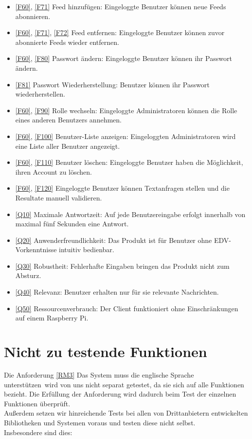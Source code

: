 \begin{itemize}
\item \ref{F60}, \ref{F71} Feed hinzufügen: Eingeloggte Benutzer können neue Feeds abonnieren.
\item \ref{F60}, \ref{F71}, \ref{F72} Feed entfernen: Eingeloggte Benutzer können zuvor abonnierte Feeds wieder entfernen.
\item \ref{F60}, \ref{F80} Passwort ändern: Eingeloggte Benutzer können ihr Passwort ändern.
\item \ref{F81} Passwort Wiederherstellung: Benutzer können ihr Passwort wiederherstellen.
\item \ref{F60}, \ref{F90} Rolle wechseln: Eingeloggte Administratoren können die Rolle eines anderen Benutzers annehmen.
\item \ref{F60}, \ref{F100} Benutzer-Liste anzeigen: Eingeloggten Administratoren wird eine Liste aller Benutzer angezeigt.
\item \ref{F60}, \ref{F110} Benutzer löschen: Eingeloggte Benutzer haben die Möglichkeit, ihren Account zu löschen.
\item \ref{F60}, \ref{F120} Eingeloggte Benutzer können Textanfragen stellen und die Resultate manuell validieren.
\item \ref{Q10} Maximale Antwortzeit: Auf jede Benutzereingabe erfolgt innerhalb von maximal fünf Sekunden eine Antwort.
\item \ref{Q20} Anwenderfreundlichkeit: Das Produkt ist für Benutzer ohne EDV-Vorkenntnisse intuitiv bedienbar.
\item \ref{Q30} Robustheit: Fehlerhafte Eingaben bringen das Produkt nicht zum Absturz.
\item \ref{Q40} Relevanz: Benutzer erhalten nur für sie relevante Nachrichten.
\item \ref{Q50} Ressourcenverbrauch: Der Client funktioniert ohne Einschränkungen auf einem Raspberry Pi.
\end{itemize}
 

\section{Nicht zu testende Funktionen}

Die Anforderung \ref{RM3} \glqq Das System muss die englische Sprache unterstützen\grqq\ wird von uns nicht separat getestet, da sie sich auf alle Funktionen bezieht. Die Erfüllung der Anforderung wird dadurch beim Test der einzelnen Funktionen überprüft.\\
Außerdem setzen wir hinreichende Tests bei allen von Drittanbietern entwickelten Bibliotheken und Systemen voraus und testen diese nicht selbst.\\
Insbesondere sind dies:

